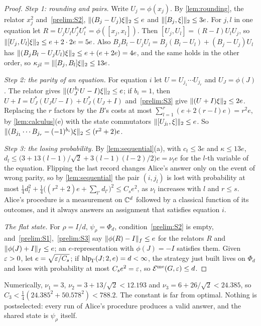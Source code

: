 \begin{proof}
\emph{Step 1: rounding and pairs.} Write $U_j=\phi(x_j)$. By \cref{lem:rounding}, the relator $x_j^2$ and~\ref{prelim:S2},
$\lVert (B_j-U_j)\xi\rVert_2\le e$ and $\lVert [B_j,\xi]\rVert_2\le3e$. For $j,l$ in one equation let $R=U_jU_lU_j^*U_l^*=\phi([x_j,x_l])$. Then
$[U_j,U_l]=(R-I)U_lU_j$, so $\lVert [U_j,U_l]\xi\rVert_2\le e+2\cdot2e=5e$. Also $B_jB_l-U_jU_l=B_j(B_l-U_l)+(B_j-U_j)U_l$ has
$\lVert (B_jB_l-U_jU_l)\xi\rVert_2\le e+(e+2e)=4e$, and the same holds in the other order, so $\kappa_{jl}=\lVert [B_j,B_l]\xi\rVert_2\le13e$.

\emph{Step 2: the parity of an equation.} For equation $i$ let $U=U_{j_1}\cdots U_{j_r}$ and $U_J=\phi(J)$. The relator gives
$\lVert (U_J^{b_i}U-I)\xi\rVert_2\le e$; if $b_i=1$, then $U+I=U_J^*(U_JU-I)+U_J^*(U_J+I)$ and~\ref{prelim:S3} give $\lVert (U+I)\xi\rVert_2\le2e$. Replacing the
$r$ factors by the $B$'s costs at most $\sum_{l=1}^r(e+2(r-l)e)=r^2e$, by \cref{lem:calculus}(e) with the state commutators
$\lVert [U_{j_l},\xi]\rVert_2\le e$. So $\lVert (B_{j_1}\cdots B_{j_r}-(-1)^{b_i})\xi\rVert_2\le(r^2+2)e$.

\emph{Step 3: the losing probability.} By \cref{lem:sequential}(a), with $c_t\le3e$ and $\kappa\le13e$,
$d_l\le\bigl(3+13(l-1)/\sqrt2+3(l-1)(l-2)/2\bigr)e=\nu_le$ for the $l$-th variable of the equation. Flipping the last record changes
Alice's answer only on the event of wrong parity, so by \cref{lem:sequential} the pair $(i,j_l)$ is lost with probability at most
$\frac14d_l^2+\frac14\bigl((r^2+2)e+\sum_{l'}d_{l'}\bigr)^2\le C_se^2$, as $\nu_l$ increases with $l$ and $r\le s$. Alice's procedure is a
measurement on $\mathbb C^d$ followed by a classical function of its outcomes, and it always answers an assignment that satisfies equation $i$.

\emph{The flat state.} For $\rho=I/d$, $\psi_\rho=\Phi_d$, condition~\ref{prelim:S2} is empty, and~\ref{prelim:S1},~\ref{prelim:S3} say
$\lVert \phi(R)-I\rVert_f\le e$ for the relators $R$ and $\lVert \phi(J)+I\rVert_f\le e$; an $e$-representation with $\phi(J)=-I$ satisfies them. Given $\varepsilon>0$,
let $e=\sqrt{\varepsilon/C_s}$; if $\operatorname{hlp}_\Gamma(J;2,e)=d<\infty$, the strategy just built lives on $\Phi_d$ and loses with probability at most
$C_se^2=\varepsilon$, so $\mathcal E^{\mathrm{me}}(G,\varepsilon)\le d$.
\end{proof}

Numerically, $\nu_1=3$, $\nu_2=3+13/\sqrt2<12.193$ and $\nu_3=6+26/\sqrt2<24.385$, so $C_3<\frac14(24.385^2+50.578^2)<788.2$. The
constant is far from optimal. Nothing is postselected: every run of Alice's procedure produces a valid answer, and the shared state is
$\psi_\rho$ itself.

